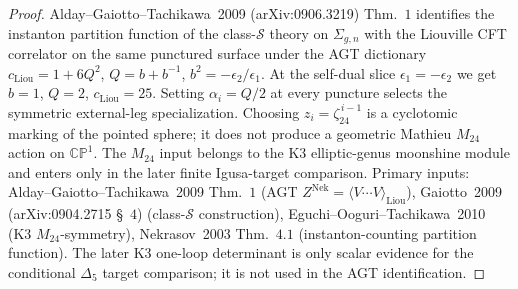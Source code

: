 \begin{proof}
Alday--Gaiotto--Tachikawa~2009 (arXiv:0906.3219) Thm.~$1$
identifies the instanton partition function of the
class-$\mathcal S$ theory on $\Sigma_{g,n}$ with the Liouville
CFT correlator on the same punctured surface under the AGT
dictionary $c_{\mathrm{Liou}} = 1 + 6 Q^2$,
$Q = b + b^{-1}$, $b^2 = -\epsilon_2/\epsilon_1$. At the
self-dual slice $\epsilon_1 = -\epsilon_2$ we get $b = 1$,
$Q = 2$, $c_{\mathrm{Liou}} = 25$. Setting
$\alpha_i = Q/2$ at every puncture selects the symmetric
external-leg specialization.  Choosing
$z_i=\zeta_{24}^{\,i-1}$ is a cyclotomic marking of the pointed
sphere; it does not produce a geometric Mathieu $M_{24}$ action on
$\mathbb{CP}^1$.  The $M_{24}$ input belongs to the K3 elliptic-genus
moonshine module and enters only in the later finite Igusa-target
comparison. Primary
inputs: Alday--Gaiotto--Tachikawa~2009 Thm.~$1$ (AGT
$Z^{\mathrm{Nek}} = \langle V\cdots V\rangle_{\mathrm{Liou}}$),
Gaiotto~2009 (arXiv:0904.2715 \S~$4$) (class-$\mathcal S$
construction), Eguchi--Ooguri--Tachikawa~2010 (K3
$M_{24}$-symmetry), Nekrasov~2003 Thm.~$4.1$
(instanton-counting partition function). The later K3 one-loop
determinant is only scalar evidence for the conditional $\Delta_5$
target comparison; it is not used in the AGT identification.
\end{proof}

